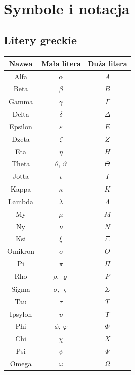 \documentclass[14pt,a4paper]{extarticle}
\begin{document}

\begin{titlepage} %
\newpage
\
\end{titlepage}

\tableofcontents %

\cleardoublepage
{}




\section{Symbole i notacja}

\begin{multicols}{2}
\renewcommand{\arraystretch}{1.2}
\setlength{\arrayrulewidth}{0.5mm}

\subsection{Litery greckie}

\begin{tabular}{*{3}{|c}|}
\hline
{} Nazwa & Mała litera & Duża litera \\
\hline
Alfa & $\alpha $ & $A $ \\ 
Beta & $\beta $ & $B $ \\
Gamma & $\gamma $ & $\Gamma $ \\
Delta & $\delta $ & $\Delta $ \\
Epsilon & $\varepsilon $ & $E $ \\
Dzeta & $\zeta $ & $Z $ \\
Eta & $\eta $ & $H $ \\
Theta & $\theta$, $\vartheta $ & $\Theta $ \\
Jotta & $\iota $ & $I $ \\
Kappa & $\kappa $ & $K $ \\
Lambda & $\lambda $ & $\Lambda $ \\
My & $\mu $ & $M $ \\
Ny & $\nu $ & $N $ \\
Ksi & $\xi $ & $\Xi $ \\
Omikron & $o $ & $O $ \\
Pi & $\pi $ & $\Pi $ \\
Rho & $\rho$, $\varrho$ & $P $ \\
Sigma & $\sigma$, $\varsigma$ & $\Sigma $ \\
Tau & $\tau $ & $T $ \\
Ipsylon & $\upsilon $ & $\Upsilon $ \\
Phi & $\phi$, $\varphi $ & $\Phi $ \\
Chi & $\chi $ & $X $ \\
Psi & $\psi $ & $\Psi $ \\
Omega & $\omega $ & $\Omega $ \\
\hline
\end{tabular}
\\\\\\


\end{multicols}
\end{document}
